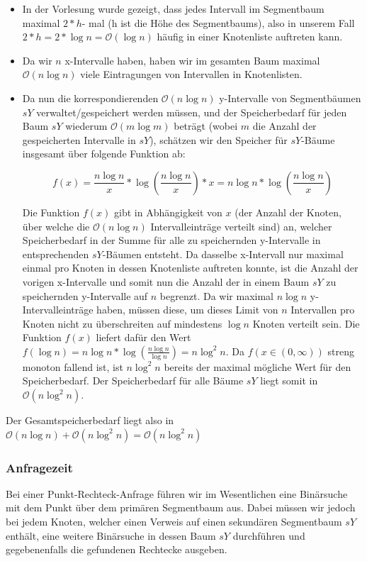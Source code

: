 \documentclass[a4paper]{article}
\begin{document}
\begin{itemize}
	\item In der Vorlesung wurde gezeigt, dass jedes Intervall im Segmentbaum maximal $2 * h$- mal (h ist die Höhe des Segmentbaums), also in unserem Fall $2 * h = 2 * \log n 
	= \mathcal{O}(\log n)$ häufig in einer Knotenliste auftreten kann.
	\item Da wir $n$ x-Intervalle haben, haben wir im gesamten Baum maximal $\mathcal{O}(n \log n)$ viele
	Eintragungen von Intervallen in Knotenlisten.
	\item Da nun die korrespondierenden $\mathcal{O}(n \log n)$ y-Intervalle von Segmentbäumen $sY$ verwaltet/gespeichert werden 	
	müssen, und der Speicherbedarf für jeden Baum $sY$ wiederum $\mathcal{O}(m \log m)$ beträgt (wobei $m$
	die Anzahl der gespeicherten Intervalle in $sY$), schätzen wir den Speicher für $sY$-Bäume insgesamt über folgende 
	Funktion ab:
	
	$$f(x) = \frac{n \log n}{x} * \log(\frac{n \log n}{x}) * x = n \log n * \log(\frac{n \log n}{x})$$
	
	Die Funktion $f(x)$ gibt in Abhängigkeit von $x$ (der Anzahl der Knoten, über welche die $\mathcal{O}(n \log n)$ Intervalleinträge verteilt sind) an, welcher Speicherbedarf in der Summe für alle zu speichernden
	y-Intervalle in entsprechenden $sY$-Bäumen entsteht. Da dasselbe x-Intervall nur maximal einmal
	pro Knoten in dessen Knotenliste auftreten konnte, ist die Anzahl der vorigen x-Intervalle und somit nun die Anzahl der in einem Baum $sY$ zu speichernden y-Intervalle auf $n$ begrenzt. Da wir maximal $n \log n$ y-Intervalleinträge haben, müssen diese, um 
	dieses Limit von $n$ Intervallen pro Knoten nicht zu überschreiten auf mindestens $\log n$ Knoten verteilt sein. Die Funktion $f(x)$ liefert dafür den Wert $f(\log n) = n \log n * \log(\frac{n \log n}{\log n}) =
	n \log^2 n$. Da $f(x \in (0, \infty))$ streng monoton fallend ist, ist $n \log^2 n$ bereits der 
	maximal mögliche Wert für den Speicherbedarf. Der Speicherbedarf für alle Bäume $sY$ liegt somit
	in $\mathcal{O}( n \log^2 n)$.
	
\end{itemize}

Der Gesamtspeicherbedarf liegt also in $\mathcal{O}(n \log n) + \mathcal{O}(n \log^2 n)
	= \mathcal{O}(n \log^2 n)$
\subsubsection*{Anfragezeit}
Bei einer Punkt-Rechteck-Anfrage führen wir im Wesentlichen eine Binärsuche mit dem Punkt über 
dem primären Segmentbaum aus. Dabei müssen wir jedoch bei jedem Knoten, welcher einen Verweis
auf einen sekundären Segmentbaum $sY$ enthält, eine weitere Binärsuche in dessen Baum $sY$ durchführen
und gegebenenfalls die gefundenen Rechtecke ausgeben. 
\end{document}
